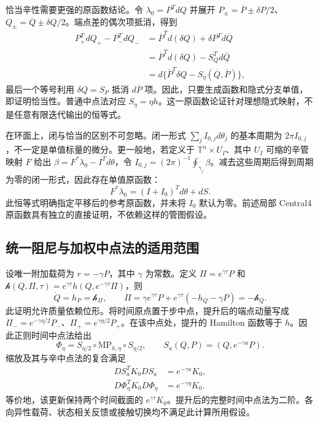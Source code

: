 恰当辛性需要更强的原函数结论。令 $\lambda_0=P^TdQ$ 并展开 $P_\pm=\overline P\pm\delta P/2$、$Q_\pm=\overline Q\pm\delta Q/2$。端点差的偶次项抵消，得到
\begin{align}
 P_+^TdQ_+-P_-^TdQ_-
 &=\overline P^Td(\delta Q)+\delta P^Td\overline Q\\
 &=\overline P^Td(\delta Q)-S_Q^Td\overline Q\\
 &=d\{\overline P^T\delta Q-S_\eta(\overline Q,\overline P)\},
 \label{eq:sup-exact-primitive}
\end{align}
最后一个等号利用 $\delta Q=S_P$ 抵消 $d\overline P$ 项。因此，只要生成函数和隐式分支单值，即证明恰当性。普通中点法对应 $S_\eta=\eta h$。这一原函数论证针对理想隐式映射，不是任意有限迭代输出的恒等式。

在环面上，闭与恰当的区别不可忽略。闭一形式 $\sum_j I_{0,j}d\theta_j$ 的基本周期为 $2\pi I_{0,j}$，不一定是单值标量的微分。更一般地，若定义于 $\mathbb T^n\times U_I$、其中 $U_I$ 可缩的辛管映射 $F$ 给出 $\beta=F^*\lambda_0-I^Td\theta$，令 $I_{0,j}=(2\pi)^{-1}\oint_{\gamma_j}\beta$。减去这些周期后得到周期为零的闭一形式，因此存在单值原函数：
\begin{equation}
 F^*\lambda_0=(I+I_0)^Td\theta+dS.
 \label{eq:sup-action-shift}
\end{equation}
此恒等式明确指定平移后的参考原函数，并未将 $I_0$ 默认为零。前述局部 Central4 原函数具有独立的直接证明，不依赖这样的管图假设。

\subsection{统一阻尼与加权中点法的适用范围}
设唯一附加载荷为 $r=-\gamma P$，其中 $\gamma$ 为常数。定义 $\Pi=e^{\gamma\tau}P$ 和 $\mathcal h(Q,\Pi,\tau)=e^{\gamma\tau}h(Q,e^{-\gamma\tau}\Pi)$，则
\begin{equation}
 \dot Q=h_P=\mathcal h_\Pi,\qquad
 \dot\Pi=\gamma e^{\gamma\tau}P+e^{\gamma\tau}(-h_Q-\gamma P)
         =-\mathcal h_Q.
 \label{eq:sup-weighted-lift}
\end{equation}
此证明允许质量依赖位形。将时间原点置于步中点，提升后的端点动量写成 $\Pi_-=e^{-\gamma\eta/2}P_-$、$\Pi_+=e^{\gamma\eta/2}P_+$。在该中点处，提升的 Hamilton 函数等于 $h$。因此正则时间中点法给出
\begin{equation}
 \Phi_\eta=S_{\eta/2}\circ\mathrm{MP}_{h,\eta}\circ S_{\eta/2},
 \qquad S_a(Q,P)=(Q,e^{-\gamma a}P).
 \label{eq:sup-weighted-method}
\end{equation}
缩放及其与辛中点法的复合满足
\begin{equation}
 \begin{aligned}
 DS_a^TK_0DS_a&=e^{-\gamma a}K_0,\\
 D\Phi_\eta^TK_0D\Phi_\eta&=e^{-\gamma\eta}K_0.
 \end{aligned}
 \label{eq:sup-weighted-pullback}
\end{equation}
等价地，该更新保持两个时间截面的 $e^{\gamma\tau}K_0$。提升后的完整时间中点法为二阶。各向异性载荷、状态相关反馈或接触切换均不满足此计算所用假设。

